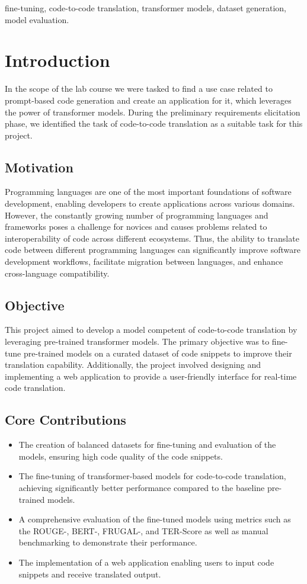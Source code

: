 \documentclass[conference]{IEEEtran}
\begin{document}
\begin{IEEEkeywords}
fine-tuning, code-to-code translation, transformer models, dataset generation, model evaluation.
\end{IEEEkeywords}

\section{Introduction}
In the scope of the lab course we were tasked to find a use case related to prompt-based code generation 
and create an application for it, which leverages the power of transformer models.
During the preliminary requirements elicitation phase, we identified the task of code-to-code translation as a suitable task for this project.

\subsection{Motivation}
Programming languages are one of the most important foundations of software development, enabling developers to create applications across various domains.
However, the constantly growing number of programming languages and frameworks poses a challenge for novices and causes problems related to interoperability of code across different ecosystems.
Thus, the ability to translate code between different programming languages can significantly improve software development workflows, 
facilitate migration between languages, and enhance cross-language compatibility.

\subsection{Objective}
This project aimed to develop a model competent of code-to-code translation by leveraging pre-trained transformer models.
The primary objective was to fine-tune pre-trained models on a curated dataset of code snippets 
to improve their translation capability.
Additionally, the project involved designing and implementing a web application to provide a user-friendly interface for real-time code translation.

\subsection{Core Contributions}
\begin{itemize}
\item The creation of balanced datasets for fine-tuning and evaluation of the models, ensuring high code quality of the code snippets. 
\item The fine-tuning of transformer-based models for code-to-code translation, achieving significantly better performance compared to the baseline pre-trained models.
\item A comprehensive evaluation of the fine-tuned models using metrics such as the ROUGE-, BERT-, FRUGAL-, and TER-Score as well as manual benchmarking to demonstrate their performance.
\item The implementation of a web application enabling users to input code snippets and receive translated output.
\end{itemize}
\end{document}

